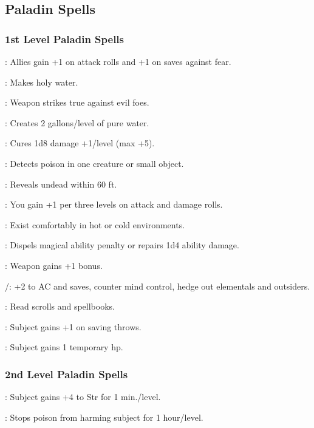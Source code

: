 \subsection{Paladin Spells}

\subsubsection{1st Level Paladin Spells}

: Allies gain +1 on attack rolls and +1 on saves against fear.

: Makes holy water.

: Weapon strikes true against evil foes.

: Creates 2 gallons/level of pure water.

: Cures 1d8 damage +1/level (max +5).

: Detects poison in one creature or small object.

: Reveals undead within 60 ft.

: You gain +1 per three levels on attack and damage rolls.

: Exist comfortably in hot or cold environments.

: Dispels magical ability penalty or repairs 1d4 ability damage.

: Weapon gains +1 bonus.

/: +2 to AC and saves, counter mind control, hedge out elementals and outsiders.

: Read scrolls and spellbooks.

: Subject gains +1 on saving throws.

: Subject gains 1 temporary hp.

\subsubsection{2nd Level Paladin Spells}

: Subject gains +4 to Str for 1 min./level.

: Stops poison from harming subject for 1 hour/level.

